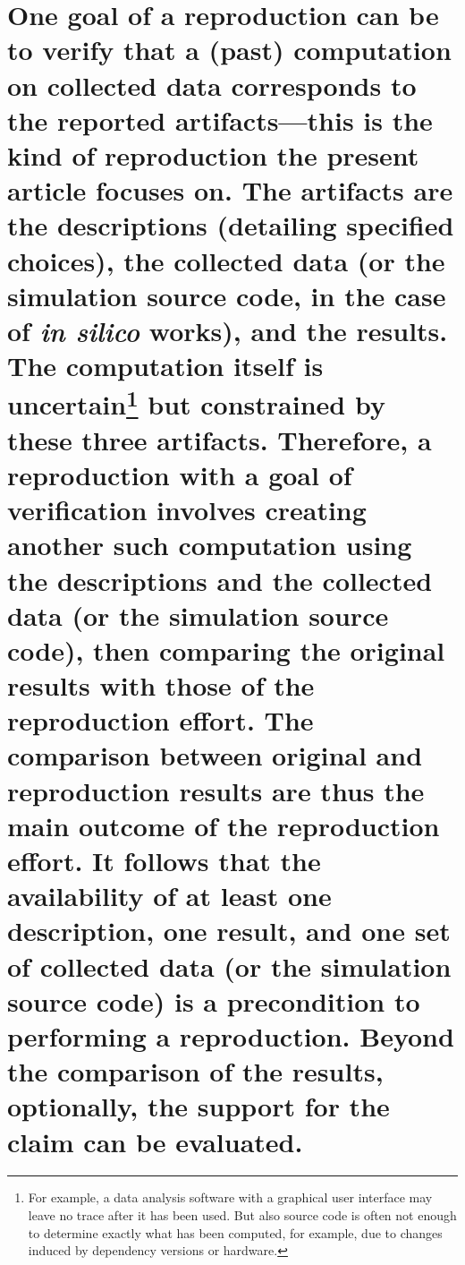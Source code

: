 \documentclass[authordate, empirical]{jote-new-article}
\begin{document}
	\section{One goal of a reproduction can be to verify that a (past) computation on collected data corresponds to the reported artifacts—this is the kind of reproduction the present article focuses on. The artifacts are the descriptions (detailing specified choices), the collected data (or the simulation source code, in the case of \emph{in silico} works), and the results. The computation itself is uncertain\footnote{ For example, a data analysis software with a graphical user interface may leave no trace after it has been used. But also source code is often not enough to determine exactly what has been computed, for example, due to changes induced by dependency versions or hardware.} but constrained by these three artifacts. Therefore, a reproduction with a goal of verification involves creating another such computation using the descriptions and the collected data (or the simulation source code), then comparing the original results with those of the reproduction effort. The comparison between original and reproduction results are thus the main outcome of the reproduction effort. It follows that the availability of at least one description, one result, and one set of collected data (or the simulation source code) is a precondition to performing a reproduction. Beyond the comparison of the results, optionally, the support for the claim can be evaluated.}
\end{document}

